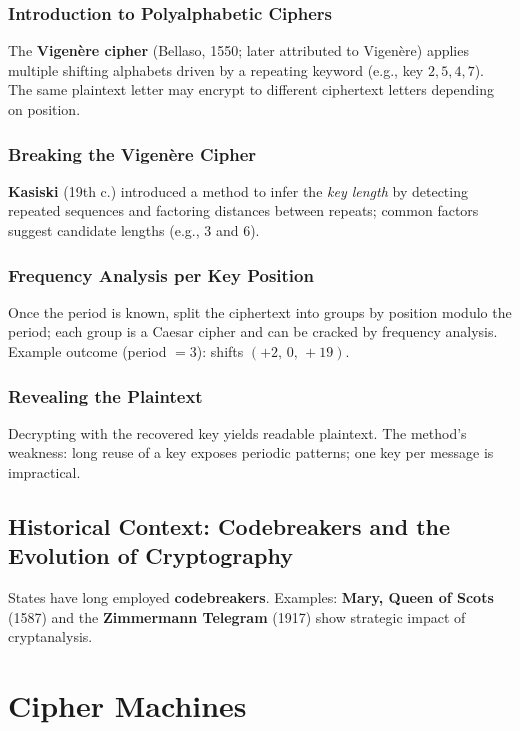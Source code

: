 \subsubsection{Introduction to Polyalphabetic Ciphers}

The \textbf{Vigenère cipher} (Bellaso, 1550; later attributed to Vigenère) applies multiple shifting alphabets driven by a repeating keyword (e.g., key \(2,5,4,7\)). The same plaintext letter may encrypt to different ciphertext letters depending on position.

\subsubsection{Breaking the Vigenère Cipher}

\textbf{Kasiski} (19th c.) introduced a method to infer the \emph{key length} by detecting repeated sequences and factoring distances between repeats; common factors suggest candidate lengths (e.g., \(3\) and \(6\)).

\subsubsection{Frequency Analysis per Key Position}

Once the period is known, split the ciphertext into groups by position modulo the period; each group is a Caesar cipher and can be cracked by frequency analysis. Example outcome (period \(=3\)): shifts \((+2,\,0,\,+19)\).

\subsubsection{Revealing the Plaintext}

Decrypting with the recovered key yields readable plaintext. The method’s weakness: long reuse of a key exposes periodic patterns; one key per message is impractical.

\subsection{Historical Context: Codebreakers and the Evolution of Cryptography}

States have long employed \textbf{codebreakers}. Examples: \textbf{Mary, Queen of Scots} (1587) and the \textbf{Zimmermann Telegram} (1917) show strategic impact of cryptanalysis.

\section{Cipher Machines}

